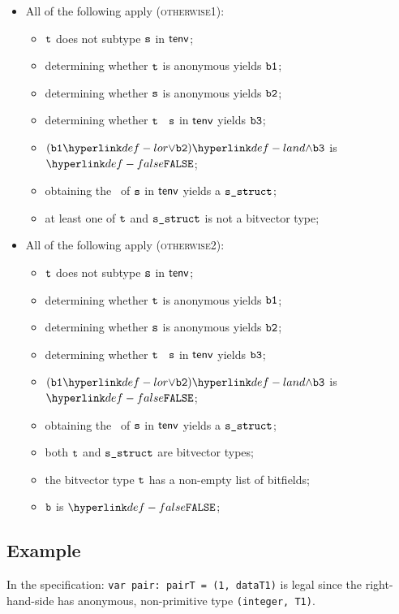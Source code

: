 \begin{itemize}
  \item All of the following apply (\textsc{otherwise1}):
  \begin{itemize}
    \item $\texttt{t}$ does not subtype $\texttt{s}$ in $\textsf{tenv}$;
    \item determining whether $\texttt{t}$ is anonymous yields $\texttt{b1}$;
    \item determining whether $\texttt{s}$ is anonymous yields $\texttt{b2}$;
    \item determining whether $\texttt{t}$ \subtypesatisfies\ $\texttt{s}$ in $\textsf{tenv}$ yields $\texttt{b3}$;
    \item $(\vbone \lor \vbtwo) \land \vbthree$ is $\False$;
    \item obtaining the \structure\ of $\texttt{s}$ in $\textsf{tenv}$ yields a $\texttt{s\_struct}$\ProseOrTypeError;
    \item at least one of $\texttt{t}$ and $\texttt{s\_struct}$ is not a bitvector type;
  \end{itemize}

  \item All of the following apply (\textsc{otherwise2}):
  \begin{itemize}
    \item $\texttt{t}$ does not subtype $\texttt{s}$ in $\textsf{tenv}$;
    \item determining whether $\texttt{t}$ is anonymous yields $\texttt{b1}$;
    \item determining whether $\texttt{s}$ is anonymous yields $\texttt{b2}$;
    \item determining whether $\texttt{t}$ \subtypesatisfies\ $\texttt{s}$ in $\textsf{tenv}$ yields $\texttt{b3}$;
    \item $(\vbone \lor \vbtwo) \land \vbthree$ is $\False$;
    \item obtaining the \structure\ of $\texttt{s}$ in $\textsf{tenv}$ yields a $\texttt{s\_struct}$\ProseOrTypeError;
    \item both $\texttt{t}$ and $\texttt{s\_struct}$ are bitvector types;
    \item the bitvector type $\texttt{t}$ has a non-empty list of bitfields;
    \item $\texttt{b}$ is $\False$;
  \end{itemize}
\end{itemize}

\subsection{Example}
In the specification:
\texttt{var pair: pairT = (1, dataT1)} is legal since the right-hand-side has
anonymous, non-primitive type \texttt{(integer, T1)}.

